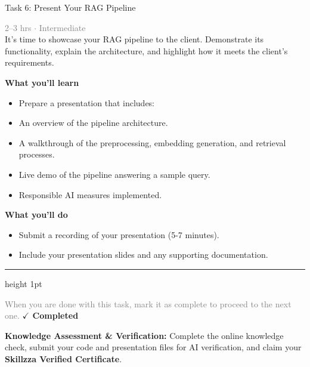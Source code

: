 \documentclass[10pt,a4paper]{article}
\begin{document}
\begin{taskbox}{Task 6: Present Your RAG Pipeline}

    {\small \textcolor{gray}{2--3 hrs $\cdot$ Intermediate}}\\[12pt]

     It’s time to showcase your RAG pipeline to the client. Demonstrate its functionality, explain the architecture, and highlight how it meets the client’s requirements.  


\vspace{8pt}
{\large \textbf{\textcolor{brandLight}{What you'll learn}}}\\[4pt]  
\begin{itemize}
    \item Prepare a presentation that includes:  
    \item An overview of the pipeline architecture.  
    \item A walkthrough of the preprocessing, embedding generation, and retrieval processes.  
    \item Live demo of the pipeline answering a sample query.  
    \item Responsible AI measures implemented.  
\end{itemize}

\vspace{8pt}
{\large \textbf{\textcolor{brandLight}{What you'll do}}}\\[4pt]  
\begin{itemize}
    \item Submit a recording of your presentation (5-7 minutes).  
    \item Include your presentation slides and any supporting documentation.\par
\end{itemize}

    \vspace{16pt}

    \textcolor{cardBorder}{\hrule height 1pt}\vspace{8pt}

    \small \textcolor{gray}{When you are done with this task, mark it as complete to proceed to the next one.} \hfill \textbf{\textcolor{brandDark}{$\checkmark$ Completed}}

\end{taskbox}

\begin{completionbox}
    \textbf{Knowledge Assessment \& Verification:} Complete the online knowledge check, submit your code and presentation files for AI verification, and claim your \textbf{Skillzza Verified Certificate}.
\end{completionbox}
\end{document}
